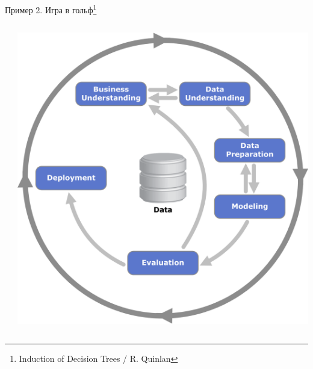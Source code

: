 \documentclass[aspectratio=169]{beamer}
\begin{document}
\begin{frame}{Пример 2. Игра в гольф\footnote{Induction of Decision Trees / R. Quinlan\vspace{1.5em}}}
\begin{columns}
\begin{column}{.7\textwidth}
    \end{column}
    \begin{column}{.3\textwidth}
    \vspace{-0em}
		\begin{center}
   		\includegraphics[width=\textwidth]{images/crisp.png}
    \end{center}
    \end{column}
  \end{columns}

\end{frame}
\end{document}
